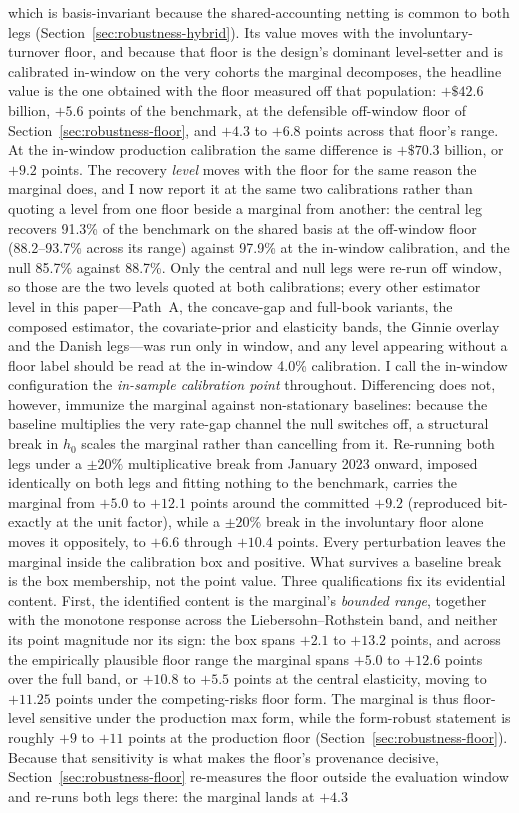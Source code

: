\documentclass[12pt]{article}
\begin{document}
which is basis-invariant because the shared-accounting netting is common to both legs (Section~\ref{sec:robustness-hybrid}). Its value moves with the involuntary-turnover floor, and because that floor is the design's dominant level-setter and is calibrated in-window on the very cohorts the marginal decomposes, the headline value is the one obtained with the floor measured off that population: $+\$42.6$ billion, $+5.6$ points of the benchmark, at the defensible off-window floor of Section~\ref{sec:robustness-floor}, and $+4.3$ to $+6.8$ points across that floor's range. At the in-window production calibration the same difference is $+\$70.3$ billion, or $+9.2$ points. The recovery \emph{level} moves with the floor for the same reason the marginal does, and I now report it at the same two calibrations rather than quoting a level from one floor beside a marginal from another: the central leg recovers 91.3\% of the benchmark on the shared basis at the off-window floor (88.2--93.7\% across its range) against 97.9\% at the in-window calibration, and the null 85.7\% against 88.7\%. Only the central and null legs were re-run off window, so those are the two levels quoted at both calibrations; every other estimator level in this paper---Path~A, the concave-gap and full-book variants, the composed estimator, the covariate-prior and elasticity bands, the Ginnie overlay and the Danish legs---was run only in window, and any level appearing without a floor label should be read at the in-window 4.0\% calibration. I call the in-window configuration the \emph{in-sample calibration point} throughout. Differencing does not, however, immunize the marginal against non-stationary baselines: because the baseline multiplies the very rate-gap channel the null switches off, a structural break in $h_0$ scales the marginal rather than cancelling from it. Re-running both legs under a $\pm 20\%$ multiplicative break from January 2023 onward, imposed identically on both legs and fitting nothing to the benchmark, carries the marginal from $+5.0$ to $+12.1$ points around the committed $+9.2$ (reproduced bit-exactly at the unit factor), while a $\pm 20\%$ break in the involuntary floor alone moves it oppositely, to $+6.6$ through $+10.4$ points. Every perturbation leaves the marginal inside the calibration box and positive. What survives a baseline break is the box membership, not the point value. Three qualifications fix its evidential content. First, the identified content is the marginal's \emph{bounded range}, together with the monotone response across the Liebersohn--Rothstein band, and neither its point magnitude nor its sign: the box spans $+2.1$ to $+13.2$ points, and across the empirically plausible floor range the marginal spans $+5.0$ to $+12.6$ points over the full band, or $+10.8$ to $+5.5$ points at the central elasticity, moving to $+11.25$ points under the competing-risks floor form. The marginal is thus floor-level sensitive under the production max form, while the form-robust statement is roughly $+9$ to $+11$ points at the production floor (Section~\ref{sec:robustness-floor}). Because that sensitivity is what makes the floor's provenance decisive, Section~\ref{sec:robustness-floor} re-measures the floor outside the evaluation window and re-runs both legs there: the marginal lands at $+4.3$ 
\end{document}
